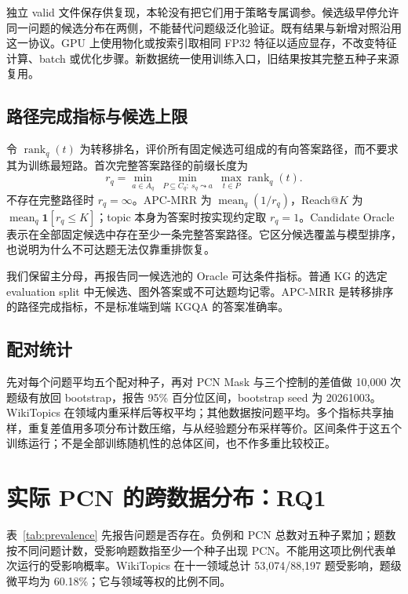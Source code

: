 \documentclass[UTF8,a4paper,10pt,fontset=fandol]{ctexart}
\begin{document}
独立 valid 文件保存供复现，本轮没有把它们用于策略专属调参。候选级早停允许同一问题的候选分布在两侧，不能替代问题级泛化验证。既有结果与新增对照沿用这一协议。GPU 上使用物化或按索引取相同 FP32 特征以适应显存，不改变特征计算、batch 或优化步骤。新数据统一使用训练入口，旧结果按其完整五种子来源复用。

\subsection{路径完成指标与候选上限}
令 $\operatorname{rank}_q(t)$ 为转移排名，评价所有固定候选可组成的有向答案路径，而不要求其为训练最短路。首次完整答案路径的前缀长度为
\begin{equation}
r_q=\min_{a\in A_q}\ \min_{P\subseteq C_q:\ s_q\leadsto a}\ \max_{t\in P}\operatorname{rank}_q(t).
\end{equation}
不存在完整路径时 $r_q=\infty$。APC-MRR 为 $\operatorname{mean}_q(1/r_q)$，Reach@$K$ 为 $\operatorname{mean}_q\mathbf1[r_q\le K]$；topic 本身为答案时按实现约定取 $r_q=1$。Candidate Oracle 表示在全部固定候选中存在至少一条完整答案路径。它区分候选覆盖与模型排序，也说明为什么不可达题无法仅靠重排恢复。

我们保留主分母，再报告同一候选池的 Oracle 可达条件指标。普通 KG 的选定 evaluation split 中无候选、图外答案或不可达题均记零。APC-MRR 是转移排序的路径完成指标，不是标准端到端 KGQA 的答案准确率。

\subsection{配对统计}
先对每个问题平均五个配对种子，再对 PCN Mask 与三个控制的差值做 10,000 次题级有放回 bootstrap，报告 95\% 百分位区间，bootstrap seed 为 20261003。WikiTopics 在领域内重采样后等权平均；其他数据按问题平均。多个指标共享抽样，重复差值用多项分布计数压缩，与从经验题分布采样等价。区间条件于这五个训练运行；不是全部训练随机性的总体区间，也不作多重比较校正。

\section{实际 PCN 的跨数据分布：RQ1}
表~\ref{tab:prevalence} 先报告问题是否存在。负例和 PCN 总数对五种子累加；题数按不同问题计数，受影响题数指至少一个种子出现 PCN。不能用这项比例代表单次运行的受影响概率。WikiTopics 在十一领域总计 53,074/88,197 题受影响，题级微平均为 60.18\%；它与领域等权的比例不同。
\end{document}
